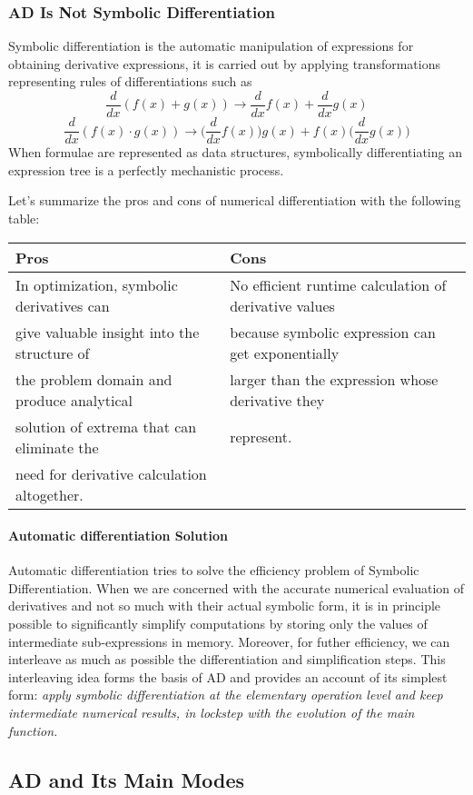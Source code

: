\subsubsection{AD Is Not Symbolic Differentiation}
Symbolic differentiation is the automatic manipulation of expressions for obtaining derivative expressions, it is carried out by applying transformations representing rules of differentiations such as
$$ \frac{d}{dx}(f(x)+g(x)) \rightarrow \frac{d}{dx} f(x) + \frac{d}{dx} g(x) $$
$$ \frac{d}{dx}(f(x)\cdot g(x))\rightarrow \bigg( \frac{d}{dx} f(x) \bigg) g(x) + f(x) \bigg( \frac{d}{dx} g(x) \bigg) $$
\noindent When formulae are represented as data structures, symbolically differentiating an expression tree is a perfectly mechanistic process. 

Let's summarize the pros and cons of numerical differentiation with the following table:

\begin{center}
\begin{tabular}{ |l|l| } 
\hline
 Pros & Cons\\
\hline
In optimization, symbolic derivatives can & No efficient runtime calculation of derivative values \\
give valuable insight into the structure of & because symbolic expression can get exponentially\\ 
the problem domain and produce analytical & larger than the expression whose derivative they \\
 solution of extrema that can eliminate the & represent.\\ 
need for derivative calculation altogether.  & \\ \hline
\end{tabular}
\end{center}

\paragraph{Automatic differentiation Solution} Automatic differentiation tries to solve the efficiency problem of Symbolic Differentiation. When we are concerned with the accurate numerical evaluation of derivatives and not so much with their actual symbolic form, it is in principle possible to significantly simplify computations by storing only the values of intermediate sub-expressions in memory. Moreover, for futher efficiency, we can interleave as much as possible the differentiation and simplification steps. This interleaving idea forms the basis of AD and provides an account of its simplest form: \textit{apply symbolic differentiation at the elementary operation level and keep intermediate numerical results, in lockstep with the evolution of the main function.}

\subsection{AD and Its Main Modes}